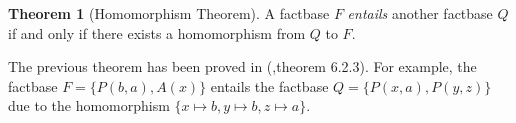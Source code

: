 \documentclass{article}
\theoremstyle{definition}
\newtheorem{theorem}{Theorem}[section]
\theoremstyle{remark}
\newtheorem{remark}{Remark}[section]
\newcommand{\Terms}{\textbf{Terms}}
\begin{document}



\begin{theorem}[Homomorphism Theorem] \label{hom_thm}
A factbase $F$ \emph{entails} another factbase $Q$ if and only if there exists a homomorphism from $Q$ to $F$.
\end{theorem}

The previous theorem has been proved in (\cite{base},theorem 6.2.3). For example, the factbase $F = \{P(b,a),A(x)\}$ entails the factbase $Q = \{P(x,a),P(y,z)\}$ due to the homomorphism $\{x \mapsto b, y \mapsto b, z \mapsto a \}$.





\end{document}
